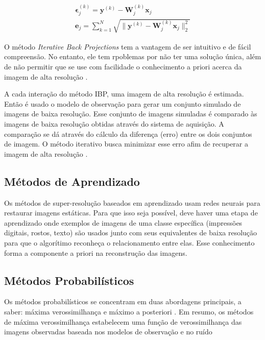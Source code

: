 \begin{gather}
	\label{eq:ibperror1} \mathbf{\epsilon}^{(k)}_j = \mathbf{y}^{(k)}-\mathbf{W}^{(k)}_j \mathbf{x}_j \\
	\label{eq:ibperrorsum} \mathbf{e}_j = \sum^N_{k=1}{\sqrt{\|\mathbf{y}^{(k)}-\mathbf{W}^{(k)}_j \mathbf{x}_j\|^2_2}}
\end{gather}

O método \emph{Iterative Back Projections} tem a vantagem de ser intuitivo e de fácil compreensão.
No entanto, ele tem rpoblemas por não ter uma solução única, além de não permitir que se use com facilidade o conhecimento a priori acerca da imagem de alta resolução \cite{nasrollahi2014super, park2003super}.


A cada interação do método IBP, uma imagem de alta resolução é estimada.
Então é usado o modelo de observação para gerar um conjunto simulado de imagens de baixa resolução.
Esse conjunto de imagens simuladas é comparado às imagens de baixa resolução obtidas através do sistema de aquisição.
A comparação se dá através do cálculo da diferença (erro) entre os dois conjuntos de imagem.
O método iterativo busca minimizar esse erro afim de recuperar a imagem de alta resolução \cite{park2003super,reis2014metodo}.
\subsection{Métodos de Aprendizado}
Os métodos de super-resolução baseados em aprendizado usam redes neurais para restaurar imagens estáticas.
Para que isso seja possível, deve haver uma etapa de aprendizado onde exemplos de imagens de uma classe específica (impressões digitais, rostos, texto) são usados junto com seus equivalentes de baixa resolução para que o algorítimo reconheça o relacionamento entre elas.
Esse conhecimento forma a componente a priori na reconstrução das imagens.

\subsection{Métodos Probabilísticos}
Os métodos probabilísticos se concentram em duas abordagens principais, a saber: máxima verossimilhança e máximo a posteriori \cite{nasrollahi2014super}.
Em resumo, os métodos de máxima verossimilhança estabelecem uma função de verossimilhança das imagens observadas baseada nos modelos de observação e no ruído


